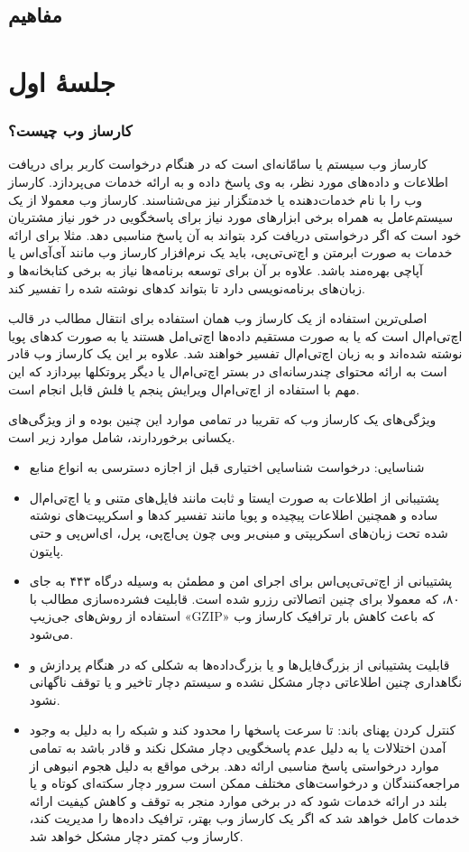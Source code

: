 \chapter{مفاهیم}
\part*{جلسهٔ اول}
\section{کارساز وب چیست؟}
\let\oldabstract\abstract
کارساز وب سیستم یا سامّانه‌ای است که  در هنگام درخواست کاربر برای دریافت اطلاعات و داده‌های مورد نظر، به وی پاسخ داده و به ارائه خدمات می‌پردازد. کارساز وب را با نام خدمات‌دهنده یا خدمتگزار نیز می‌شناسند. کارساز وب معمولا از یک سیستم‌عامل به همراه برخی ابزارهای مورد نیاز برای پاسخگویی در خور نیاز مشتریان خود است که اگر درخواستی دریافت کرد بتواند به آن پاسخ مناسبی دهد. مثلا برای ارائه خدمات به صورت ابر‌متن و اچ‌تی‌تی‌پی، باید یک نرم‌افزار کارساز وب مانند آی‌آی‌اس یا آپاچی بهره‌مند باشد. علاوه بر آن برای توسعه برنامه‌ها نیاز به برخی کتابخانه‌ها و زبان‌های برنامه‌نویسی دارد تا بتواند کد‌های نوشته شده را تفسیر کند.

اصلی‌ترین استفاده از یک کارساز وب همان استفاده برای انتقال مطالب در قالب اچ‌تی‌ام‌ال است که یا به صورت مستقیم داده‌ها اچ‌تی‌امل هستند یا به صورت کد‌های پویا نوشته شده‌اند و به زبان اچ‌تی‌ام‌ال تفسیر خواهند شد. علاوه بر این یک کارساز وب قادر است به ارائه محتوای چندرسانه‌ای در بستر اچ‌تی‌ام‌ال یا دیگر پروتکلها بپردازد که این مهم با استفاده از اچ‌تی‌ام‌ال ویرایش پنجم  یا فلش قابل انجام است. 

ویژگی‌های یک کارساز وب که تقریبا در تمامی موارد این چنین بوده و از ویژگی‌های یکسانی برخوردارند، شامل موارد زیر است.
\begin{itemize}
\item
	شناسایی: درخواست شناسایی اختیاری قبل از اجازه دسترسی به انواع منابع
\item
	پشتیبانی از اطلاعات به صورت ایستا و ثابت مانند فایل‌های متنی و یا اچ‌تی‌ام‌ال ساده و همچنین اطلاعات پیچیده و پویا  مانند تفسیر کدها و اسکریپت‌های نوشته شده تحت زبان‌های اسکریپتی و مبنی‌بر وبی چون پی‌اچ‌پی، پرل، ای‌اس‌پی و حتی پایتون.
\item
	پشتیبانی از اچ‌تی‌تی‌پی‌اس برای اجرای امن و مطمئن به وسیله درگاه  ۴۴۳ به جای ۸۰، که معمولا برای چنین اتصالاتی رزرو شده است.
	قابلیت فشرده‌سازی مطالب با استفاده از روش‌های جی‌زیپ «GZIP» که باعث کاهش بار ترافیک کارساز وب می‌شود.
\item
	قابلیت پشتیبانی از بزرگ‌فایل‌ها و یا بزرگ‌داده‌ها به شکلی که در هنگام پردازش و نگاهداری چنین اطلاعاتی دچار مشکل نشده و سیستم دچار تاخیر و یا توقف ناگهانی نشود.
\item
	کنترل کردن پهنای باند: تا سرعت پاسخها را محدود کند و شبکه را به دلیل به وجود آمدن اختلالات یا به دلیل عدم پاسخگویی دچار مشکل نکند و قادر باشد به تمامی موارد درخواستی پاسخ مناسبی ارائه دهد. برخی مواقع به دلیل هجوم انبوهی از مراجعه‌کنندگان و درخواست‌های مختلف ممکن است سرور دچار سکته‌ای کوتاه و یا بلند در ارائه خدمات شود که در برخی موارد منجر به توقف و کاهش کیفیت ارائه خدمات کامل خواهد شد که اگر یک کارساز وب بهتر، ترافیک داده‌ها را مدیریت کند، کارساز وب کمتر دچار مشکل خواهد شد.
	
\end{itemize}
